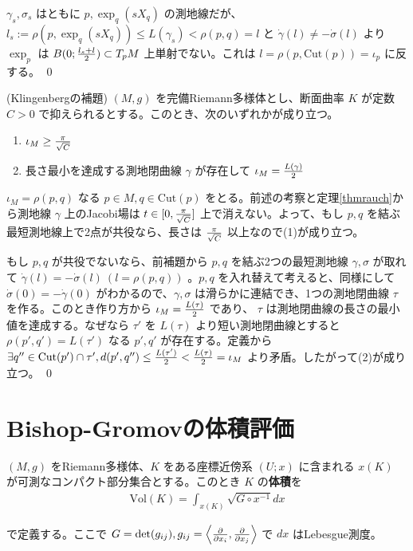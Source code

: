 \documentclass[dvipdfmx,a4paper]{jsreport}
\theoremstyle{definition}
\newcommand{\der}{\partial}
\begin{document}
$\gamma_s,\sigma_s$ はともに $p,\exp_q(sX_q)$ の測地線だが、 $l_s:=\rho(p,\exp_q(sX_q)) \leq L(\gamma_s)<\rho(p,q)=l$ と $\dot{\gamma}(l) \neq -\dot{\sigma}(l)$ より $\exp_p$ は $B(0;{l_s+l \over 2}) \subset T_pM$ 上単射でない。これは $l=\rho(p,\mbox{Cut}(p))=\iota_p$ に反する。 \qed 


\thm\label{thmklingenberg} (Klingenbergの補題) $(M,g)$ を完備Riemann多様体とし、断面曲率 $K$ が定数 $C>0$ で抑えられるとする。このとき、次のいずれかが成り立つ。
\begin{enumerate}
    \item $\iota_M \geq {\pi \over \sqrt{C}}$
    \item 長さ最小を達成する測地閉曲線 $\gamma$ が存在して $\iota_M={L(\gamma) \over 2}$
\end{enumerate}

\prf $\iota_M=\rho(p,q)$ なる $p \in M,q \in \mbox{Cut}(p)$ をとる。前述の考察と定理\ref{thmrauch}から測地線 $\gamma$ 上のJacobi場は $t \in [0,{\pi \over \sqrt{C}}]$ 上で消えない。よって、もし $p,q$ を結ぶ最短測地線上で2点が共役なら、長さは ${\pi \over \sqrt{C}}$ 以上なので(1)が成り立つ。

もし $p,q$ が共役でないなら、前補題から $p,q$ を結ぶ2つの最短測地線 $\gamma,\sigma$ が取れて $\dot{\gamma}(l)=-\dot{\sigma}(l)\ (l=\rho(p,q))$ 。$p,q$ を入れ替えて考えると、同様にして $\dot{\sigma}(0)=-\dot{\gamma}(0)$ がわかるので、$\gamma,\sigma$ は滑らかに連結でき、1つの測地閉曲線 $\tau$ を作る。このとき作り方から $\iota_M={L(\tau) \over 2}$ であり、 $\tau$ は測地閉曲線の長さの最小値を達成する。なぜなら $\tau'$ を $L(\tau)$ より短い測地閉曲線とすると $\rho(p',q')=L(\tau')$ なる $p',q'$ が存在する。定義から $\exists q'' \in \mbox{Cut}(p') \cap \tau',d(p',q'') \leq {L(\tau') \over 2}<{L(\tau) \over 2}=\iota_M$ より矛盾。したがって(2)が成り立つ。 \qed 

\section{Bishop-Gromovの体積評価}

 $(M,g)$ をRiemann多様体、$K$ をある座標近傍系 $(U;x)$ に含まれる $x(K)$ が可測なコンパクト部分集合とする。このとき $K$ の\textbf{体積}を
\begin{align*}
    \mbox{Vol}(K)=\int_{x(K)} \sqrt{G \circ x^{-1}}dx
\end{align*}

で定義する。ここで $G=\det(g_{ij}),g_{ij}=\ev{{\der \over \der x_i},{\der \over \der x_j}}$ で $dx$ はLebesgue測度。
\end{document}
